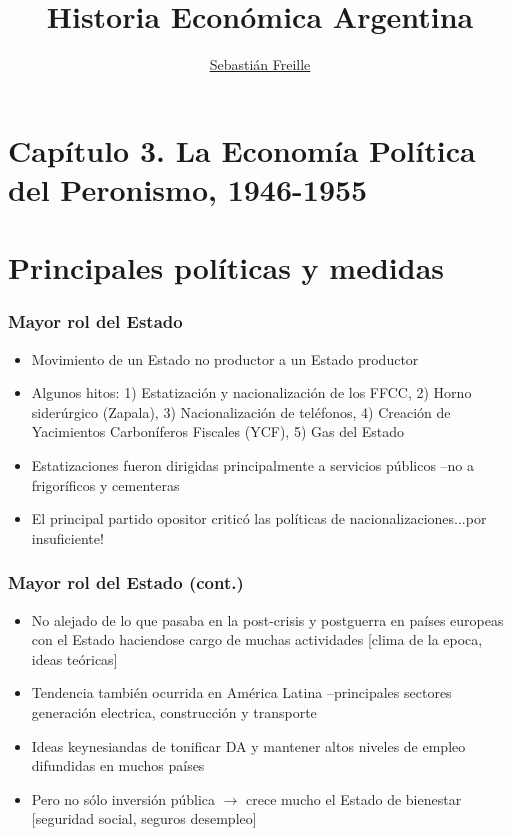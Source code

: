 \documentclass[14pt,aspectratio=169]{beamer}
\title{Historia Económica Argentina}
\author{\underline{Sebastián Freille} \inst{1}}
\institute[shortinst]{\inst{1} IEF-UNC \\ UCC}
\date{}
\begin{document}
{
  \begin{frame}
    \titlepage
  \end{frame}
}

  
  \section{Capítulo 3. La Economía Política del Peronismo, 1946-1955}


  \section{Principales políticas y medidas}
  

 \begin{frame}\frametitle{Mayor rol del Estado}
    \begin{itemize}\itemsep 10pt
      \item Movimiento de un Estado no productor a un Estado productor
        \item Algunos hitos: 1) Estatización y nacionalización de los
          FFCC, 2) Horno siderúrgico (Zapala), 3) Nacionalización de
          teléfonos, 4) Creación de Yacimientos Carboníferos Fiscales
          (YCF), 5) Gas del Estado
          \item Estatizaciones fueron dirigidas principalmente a
            servicios públicos --no a frigoríficos y cementeras
            \item El principal partido opositor criticó las políticas
              de nacionalizaciones...por insuficiente!
                 \end{itemize}
               \end{frame}

               
               \begin{frame}\frametitle{Mayor rol del Estado (cont.)}
    \begin{itemize}\itemsep 10pt
      \item No alejado de lo que pasaba en la post-crisis y postguerra
        en países europeas con el Estado haciendose cargo de muchas
        actividades [clima de la epoca, ideas teóricas]
        \item Tendencia también ocurrida en América Latina
          --principales sectores generación electrica, construcción y
          transporte
          \item Ideas keynesiandas de tonificar DA y mantener altos
            niveles de empleo difundidas en muchos países
            \item Pero no sólo inversión pública $\longrightarrow$
              crece mucho el Estado de bienestar [seguridad social,
              seguros desempleo]
                 \end{itemize}
      \end{frame}
\end{document}
